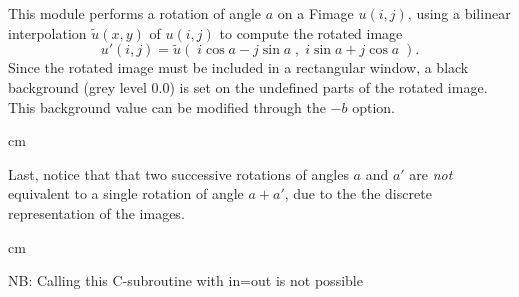 This module performs a rotation of angle $a$ on a Fimage $u(i,j)$, using
a bilinear interpolation $\tilde{u}(x,y)$ of $u(i,j)$ to compute the rotated 
image
$$u'(i,j) = \tilde{u}(\;i \cos a - j \sin a\;,\;i \sin a + j \cos a\;).$$
Since the rotated image must be included in a rectangular window, a 
black background (grey level $0.0$) is set on the undefined parts of
the rotated image. This background value can be modified through the 
$-b$ option.

 cm

Last, notice that that two successive rotations of angles $a$ and $a'$ 
are {\em not} equivalent to a single rotation of angle $a+a'$, due to
the the discrete representation of the images.

 cm

NB: Calling this C-subroutine with in=out is not possible
